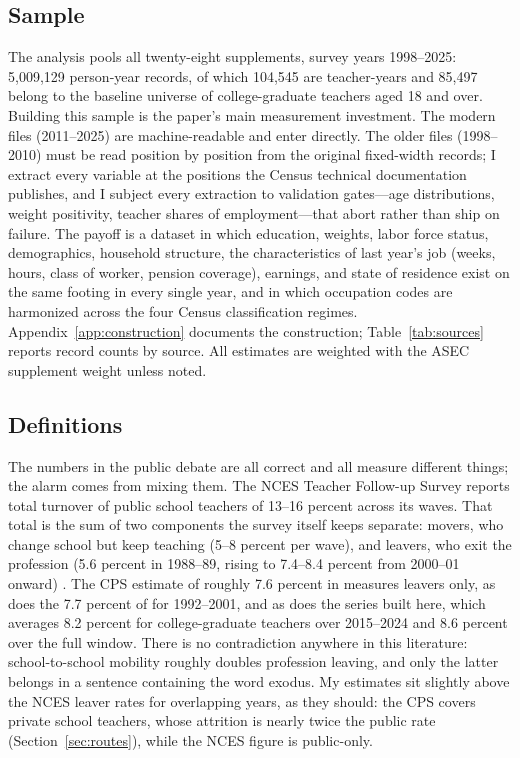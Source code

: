 \documentclass[11pt,a4paper]{article}
\begin{document}
\subsection{Sample}

The analysis pools all twenty-eight supplements, survey years
1998--2025: 5,009,129 person-year records, of which 104,545 are
teacher-years and 85,497 belong to the baseline universe of
college-graduate teachers aged 18 and over. Building this sample is
the paper's main measurement investment. The modern files
(2011--2025) are machine-readable and enter directly. The older files
(1998--2010) must be read position by position from the original
fixed-width records; I extract every variable at the positions the
Census technical documentation publishes, and I subject every
extraction to validation gates---age distributions, weight positivity,
teacher shares of employment---that abort rather than ship on failure.
The payoff is a dataset in which education, weights, labor force
status, demographics, household structure, the characteristics of last
year's job (weeks, hours, class of worker, pension coverage),
earnings, and state of residence exist on the same footing in every
single year, and in which occupation codes are harmonized across the
four Census classification regimes.
Appendix~\ref{app:construction} documents the construction;
Table~\ref{tab:sources} reports record counts by source. All estimates
are weighted with the ASEC supplement weight unless noted.

\subsection{Definitions}
\label{sec:definitions}

The numbers in the public debate are all correct and all measure
different things; the alarm comes from mixing them. The NCES Teacher
Follow-up Survey reports total turnover of public school teachers of
13--16 percent across its waves. That total is the sum of two
components the survey itself keeps separate: movers, who change school
but keep teaching (5--8 percent per wave), and leavers, who exit the
profession (5.6 percent in 1988--89, rising to 7.4--8.4 percent from
2000--01 onward) \citep{nces2024,tan2025}. The CPS estimate of roughly
7.6 percent in \citet{aldeman2025} measures leavers only, as does the
7.7 percent of \citet{harris2007} for 1992--2001, and as does the
series built here, which averages 8.2 percent for college-graduate
teachers over 2015--2024 and 8.6 percent over the full window. There
is no contradiction anywhere in this literature: school-to-school
mobility roughly doubles profession leaving, and only the latter
belongs in a sentence containing the word exodus. My estimates sit
slightly above the NCES leaver rates for overlapping years, as they
should: the CPS covers private school teachers, whose attrition is
nearly twice the public rate (Section~\ref{sec:routes}), while the
NCES figure is public-only.
\end{document}
